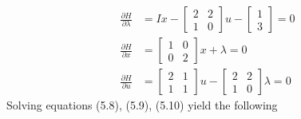 \documentclass{article}
\begin{document}
  \begin{align*}
    \frac{\partial H}{\partial \lambda} &= Ix - 
    \begin{bmatrix}
      2 & 2 \\
      1 & 0
    \end{bmatrix}u - 
    \begin{bmatrix}
      1 \\
      3
    \end{bmatrix} = 0 \tag{5.8} \\
    \frac{\partial H}{\partial x} &= 
    \begin{bmatrix}
      1 & 0 \\
      0 & 2
    \end{bmatrix}x + \lambda = 0 \tag{5.9} \\
    \frac{\partial H}{\partial u} &= 
    \begin{bmatrix}
      2 & 1 \\
      1 & 1
    \end{bmatrix}u - 
    \begin{bmatrix}
      2 & 2 \\
      1 & 0
    \end{bmatrix} \lambda  = 0 \tag{5.10} 
  \end{align*}
  Solving equations (5.8), (5.9), (5.10) yield the following
\end{document}
